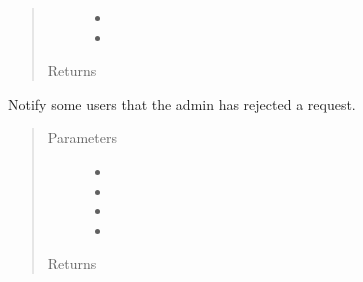 \documentclass[letterpaper,10pt,english]{sphinxmanual}
\begin{document}
\begin{fulllineitems}
\begin{fulllineitems}
\begin{quote}
\begin{description}
\begin{itemize}
\item {} 
 \textendash{} 

\item {} 
 \textendash{} 

\end{itemize}

\item[{Returns}] \leavevmode


\end{description}\end{quote}

\end{fulllineitems}


\begin{fulllineitems}
\label{\detokenize{apidoc/utdesign_procurement:utdesign_procurement.emailer.EmailHandler.notifyRejectedAdmin}}
Notify some users that the admin has rejected a request.
\begin{quote}\begin{description}
\item[{Parameters}] \leavevmode\begin{itemize}
\item {} 
 \textendash{} 

\item {} 
 \textendash{} 

\item {} 
 \textendash{} 

\item {} 
 \textendash{} 

\end{itemize}

\item[{Returns}] \leavevmode


\end{description}\end{quote}


\end{fulllineitems}
\end{fulllineitems}
\end{document}
